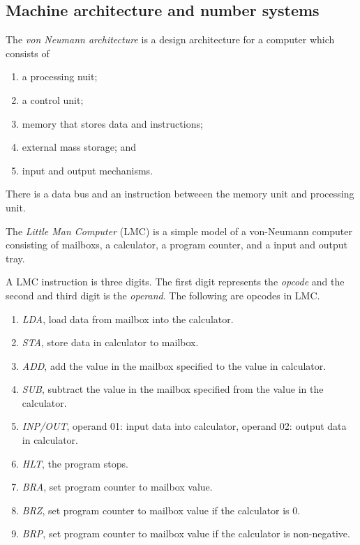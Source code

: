 \subsection{Machine architecture and number systems}

\begin{definition}
	The \emph{von Neumann architecture} is a design architecture for a computer
	which consists of
	\begin{enumerate}
		\item a processing nuit;
		\item a control unit;
		\item memory that stores data and instructions;
		\item external mass storage; and
		\item input and output mechanisms.
	\end{enumerate}
	There is a data bus and an instruction betweeen the memory unit and
	processing unit.
\end{definition}

The \emph{Little Man Computer} (LMC) is a simple model of a von-Neumann
computer consisting of mailboxs, a calculator, a program counter, and a
input and output tray.

A LMC instruction is three digits. The first digit represents the
\emph{opcode} and the second and third digit is the \emph{operand}.
The following are opcodes in LMC.
\begin{enumerate}
	\item \emph{LDA}, load data from mailbox into the calculator.
	\item \emph{STA}, store data in calculator to mailbox.
	\item \emph{ADD}, add the value in the mailbox specified to the value in
		calculator.
	\item \emph{SUB}, subtract the value in the mailbox specified from the 
		value in the calculator.
	\item \emph{INP/OUT}, operand 01: input data into calculator, 
		operand 02: output data in calculator.
	\item \emph{HLT}, the program stops.
	\item \emph{BRA}, set program counter to mailbox value.
	\item \emph{BRZ}, set program counter to mailbox value if the calculator 
		is 0.
	\item \emph{BRP}, set program counter to mailbox value if the calculator is
		non-negative.
\end{enumerate}

